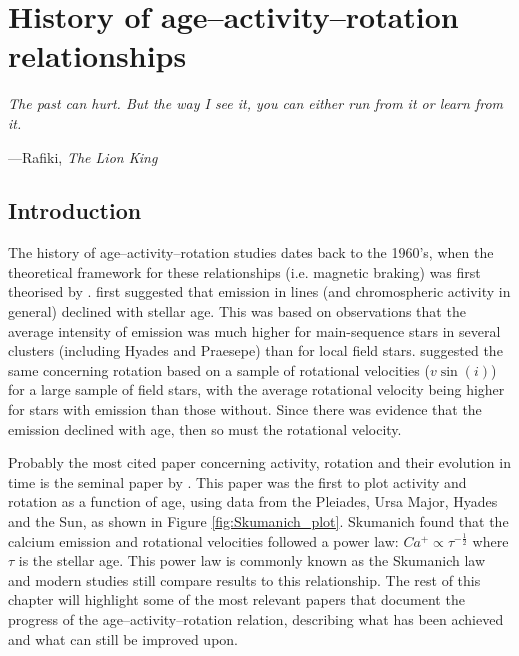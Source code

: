 
\chapter{History of age--activity--rotation relationships} %

\label{Chapter2} %


\epigraph{\itshape The past can hurt. But the way I see it, you can either run from it or learn from it.}{---Rafiki, \textit{The Lion King}}

\section{Introduction}

The history of age--activity--rotation studies dates back to the 1960's, when the theoretical framework for these relationships (i.e. magnetic braking) was first theorised by \citet{Schatzman_1962}. \citet{Wilson_1963} first suggested that emission in \caII lines (and chromospheric activity in general) declined with stellar age. This was based on observations that the average intensity of \caII emission was much higher for main-sequence stars in several clusters (including Hyades and Praesepe) than for local field stars. \citet{Kraft_1967} suggested the same concerning rotation based on a sample of rotational velocities ($v\sin(i)$) for a large sample of field stars, with the average rotational velocity being higher for stars with \caII emission than those without. Since there was evidence that the \caII emission declined with age, then so must the rotational velocity.

Probably the most cited paper concerning activity, rotation and their evolution in time is the seminal paper by \citet{Skumanich_1972}. This paper was the first to plot activity and rotation as a function of age, using data from the Pleiades, Ursa Major, Hyades and the Sun, as shown in Figure \ref{fig:Skumanich_plot}. Skumanich found that the calcium emission and rotational velocities followed a power law: $Ca^{+} \propto \tau^{-\frac{1}{2}}$ where $\tau$ is the stellar age. This power law is commonly known as the Skumanich law and modern studies still compare results to this relationship. The rest of this chapter will highlight some of the most relevant papers that document the progress of the age--activity--rotation relation, describing what has been achieved and what can still be improved upon.

